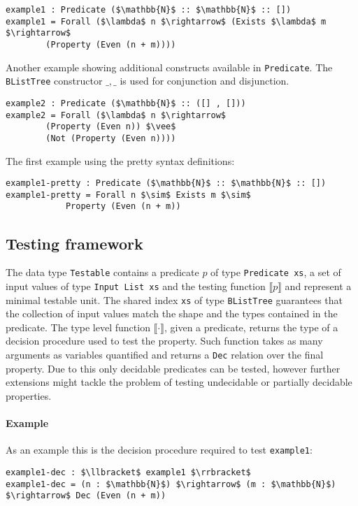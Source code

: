 \documentclass[10pt,a4paper]{article}
\begin{document}
\begin{itemize}
\begin{lstlisting}
example1 : Predicate ($\mathbb{N}$ :: $\mathbb{N}$ :: [])
example1 = Forall ($\lambda$ n $\rightarrow$ (Exists $\lambda$ m $\rightarrow$
		(Property (Even (n + m))))
\end{lstlisting}

Another example showing additional constructs available in \texttt{Predicate}.
The \texttt{BListTree} constructor $\_,\_$ is used for conjunction and disjunction.
\begin{lstlisting}
example2 : Predicate ($\mathbb{N}$ :: ([] , []))
example2 = Forall ($\lambda$ n $\rightarrow$ 
		(Property (Even n)) $\vee$ 
		(Not (Property (Even n))))
\end{lstlisting}

The first example using the pretty syntax definitions:
\begin{lstlisting}
example1-pretty : Predicate ($\mathbb{N}$ :: $\mathbb{N}$ :: [])
example1-pretty = Forall n $\sim$ Exists m $\sim$ 
			Property (Even (n + m))
\end{lstlisting}

\end{itemize}

\subsection{Testing framework}
The data type \texttt{Testable} contains a predicate $p$ of type \texttt{Predicate xs}, a set of input values of type \texttt{Input List xs} and the testing function $\llbracket p \rrbracket$ and represent a minimal testable unit. The shared index \texttt{xs} of type \texttt{BListTree} guarantees that the collection of input values match the shape and the types contained in the predicate.
The type level function $\llbracket \cdot \rrbracket$, given a predicate, returns the type of a decision procedure used to test the property.
Such function takes as many arguments as variables quantified and returns a \texttt{Dec} relation over the final property. Due to this only decidable predicates can be tested, however further extensions might tackle the problem of testing undecidable or partially decidable properties.

\paragraph{Example}
As an example this is the decision procedure required to test \texttt{example1}:
\begin{lstlisting}
example1-dec : $\llbracket$ example1 $\rrbracket$
example1-dec = (n : $\mathbb{N}$) $\rightarrow$ (m : $\mathbb{N}$) $\rightarrow$ Dec (Even (n + m))
\end{lstlisting}
\end{document}
